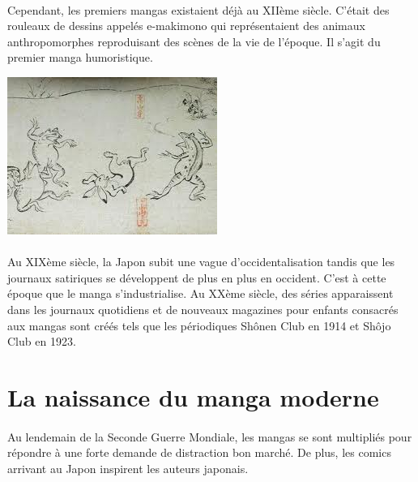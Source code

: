 \paragraph{}
Cependant, les premiers mangas existaient déjà au XIIème  siècle. C’était des rouleaux de dessins appelés e-makimono qui représentaient des animaux anthropomorphes reproduisant des scènes de la vie de l’époque. Il s’agit du premier manga humoristique.
\begin{center}
\includegraphics[scale=0.7]{emakimono.jpg}
\end{center}
\paragraph{}
Au XIXème siècle, la Japon subit une vague d’occidentalisation tandis que les journaux satiriques se développent de plus en plus en occident. C’est à cette époque que le manga s’industrialise. Au XXème siècle, des séries apparaissent dans les journaux quotidiens et de nouveaux magazines pour enfants consacrés aux mangas sont créés tels que les périodiques Shônen Club en 1914 et Shôjo Club en 1923.

\section{La naissance du manga moderne}
\paragraph{}
Au lendemain de la Seconde Guerre Mondiale, les mangas se sont multipliés pour répondre à une forte demande de distraction bon marché. De plus, les comics arrivant au Japon inspirent les auteurs japonais. 

